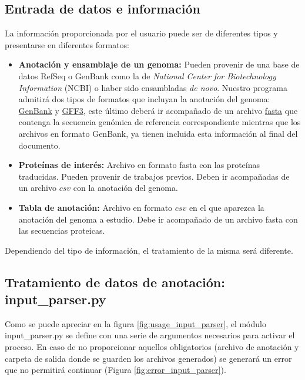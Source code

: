 \subsection{Entrada de datos e información}

La información proporcionada por el usuario puede ser de diferentes tipos y presentarse en diferentes formatos:

\begin{itemize}
\item \textbf{Anotación y ensamblaje de un genoma:} Pueden provenir de una base de datos RefSeq o GenBank como la de \textit{National Center for Biotechnology Information} (NCBI) \cite{national_center_for_biotechnology_information_national_1988} o haber sido ensambladas \textit{de novo}. Nuestro programa admitirá dos tipos de formatos que incluyan la anotación del genoma:  \href{https://www.ncbi.nlm.nih.gov/Sitemap/samplerecord.html}{GenBank} y \href{https://www.ncbi.nlm.nih.gov/Sitemap/samplerecord.html}{GFF3}, este último deberá ir acompañado de un archivo \href{https://blast.ncbi.nlm.nih.gov/Blast.cgi?CMD=Web&PAGE_TYPE=BlastDocs&DOC_TYPE=BlastHelp}{fasta} que contenga la secuencia genómica de referencia correspondiente mientras que los archivos en formato GenBank, ya tienen incluida esta información al final del documento.

\item \textbf{Proteínas de interés:} Archivo en formato fasta con las proteínas traducidas. Pueden provenir de trabajos previos. Deben ir acompañadas de un archivo $csv$ con la anotación del genoma.
\item \textbf{Tabla de anotación:} Archivo en formato $csv$ en el que aparezca la anotación del genoma a estudio. Debe ir acompañado de un archivo fasta con las secuencias proteicas.
\end{itemize}

Dependiendo del tipo de información, el tratamiento de la misma será diferente.

\subsection{Tratamiento de datos de anotación: input\_parser.py}

Como se puede apreciar en la figura \ref{fig:usage_input_parser}, el módulo input\_parser.py se define con una serie de argumentos necesarios para activar el proceso. En caso de no proporcionar aquellos obligatorios (archivo de anotación y carpeta de salida donde se guarden los archivos generados) se generará un error que no permitirá continuar (Figura \ref{fig:error_input_parser}). 



